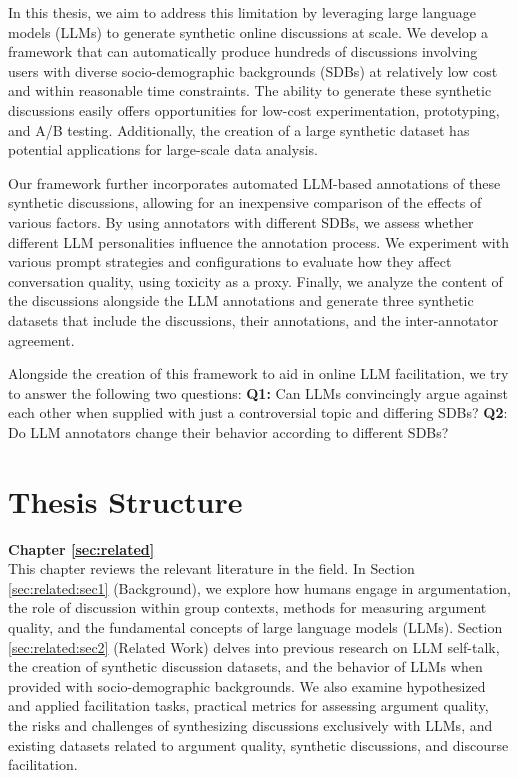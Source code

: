 In this thesis, we aim to address this limitation by leveraging large language models (LLMs) to generate synthetic online discussions at scale. We develop a framework that can automatically produce hundreds of discussions involving users with diverse socio-demographic backgrounds (SDBs) at relatively low cost and within reasonable time constraints. The ability to generate these synthetic discussions easily offers opportunities for low-cost experimentation, prototyping, and A/B testing. Additionally, the creation of a large synthetic dataset has potential applications for large-scale data analysis.

Our framework further incorporates automated LLM-based annotations of these synthetic discussions, allowing for an inexpensive comparison of the effects of various factors. By using annotators with different SDBs, we assess whether different LLM personalities influence the annotation process. We experiment with various prompt strategies and configurations to evaluate how they affect conversation quality, using toxicity as a proxy. Finally, we analyze the content of the discussions alongside the LLM annotations and generate three synthetic datasets that include the discussions, their annotations, and the inter-annotator agreement.

Alongside the creation of this framework to aid in online LLM facilitation, we try to answer the following two questions: \textbf{Q1:} Can LLMs convincingly argue against each other when supplied with just a controversial topic and differing SDBs? \textbf{Q2}: Do LLM annotators change their behavior according to different SDBs?

\section{Thesis Structure}
\label{sec:intro:structure}

\textbf{Chapter \ref{sec:related}} \\[0.2em]

This chapter reviews the relevant literature in the field. In Section \ref{sec:related:sec1} (Background), we explore how humans engage in argumentation, the role of discussion within group contexts, methods for measuring argument quality, and the fundamental concepts of large language models (LLMs). Section \ref{sec:related:sec2} (Related Work) delves into previous research on LLM self-talk, the creation of synthetic discussion datasets, and the behavior of LLMs when provided with socio-demographic backgrounds. We also examine hypothesized and applied facilitation tasks, practical metrics for assessing argument quality, the risks and challenges of synthesizing discussions exclusively with LLMs, and existing datasets related to argument quality, synthetic discussions, and discourse facilitation.


